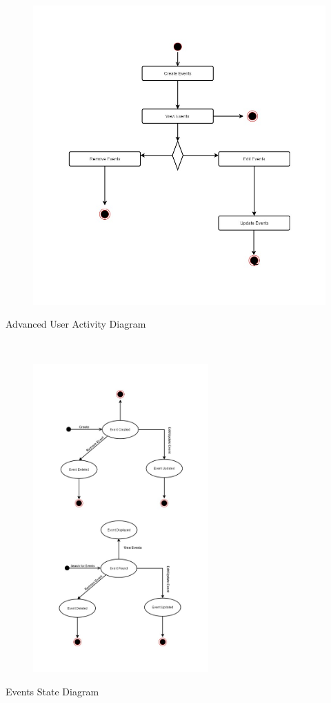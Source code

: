 \documentclass{article}
\begin{document}
    \mbox{}\\
    \bigskip
    \clearpage
    
    \begin{figure}[h!]
        \includegraphics[width=\textwidth]{Images/ActivityDiagramAdmin.jpg}
    \end{figure}
    Advanced User Activity Diagram
    
    \mbox{}\\
    \bigskip
    \clearpage
    
    \begin{figure}[h!]
        \begin{center}
            \includegraphics[width=0.6\textwidth]{Images/StateDiagramEvent.jpg}
        \end{center}
    \end{figure}
    Events State Diagram
    
    \mbox{}\\
\end{document}
